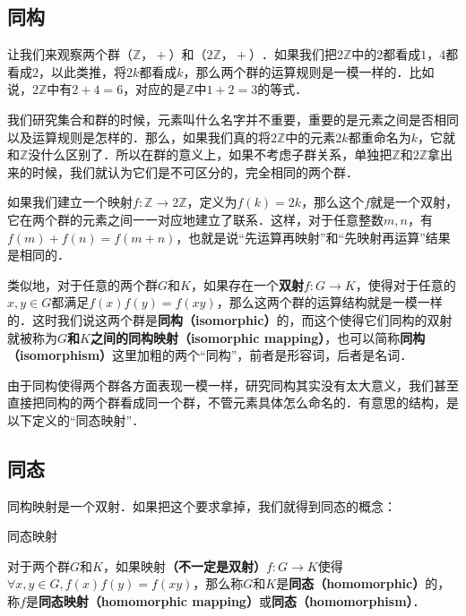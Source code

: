

\subsection{同构}

让我们来观察两个群$（\mathbb{Z}， +）$和$（2\mathbb{Z}，+）$．如果我们把$2\mathbb{Z}$中的$2$都看成$1$，$4$都看成$2$，以此类推，将$2k$都看成$k$，那么两个群的运算规则是一模一样的．比如说，$2\mathbb{Z}$中有$2+4=6$，对应的是$\mathbb{Z}$中$1+2=3$的等式．

我们研究集合和群的时候，元素叫什么名字并不重要，重要的是元素之间是否相同以及运算规则是怎样的．那么，如果我们真的将$2\mathbb{Z}$中的元素$2k$都重命名为$k$，它就和$\mathbb{Z}$没什么区别了．所以在群的意义上，如果不考虑子群关系，单独把$\mathbb{Z}$和$2\mathbb{Z}$拿出来的时候，我们就认为它们是不可区分的，完全相同的两个群．

如果我们建立一个映射$f:\mathbb{Z}\rightarrow2\mathbb{Z}$，定义为$f(k)=2k$，那么这个$f$就是一个双射，它在两个群的元素之间一一对应地建立了联系．这样，对于任意整数$m, n$，有$f(m)+f(n)=f(m+n)$，也就是说“先运算再映射”和“先映射再运算”结果是相同的．

类似地，对于任意的两个群$G$和$K$，如果存在一个\textbf{双射}$f:G\rightarrow K$，使得对于任意的$x, y\in G$都满足$f(x)f(y)=f(xy)$，那么这两个群的运算结构就是一模一样的．这时我们说这两个群是\textbf{同构（isomorphic）}的，而这个使得它们同构的双射就被称为\textbf{$G$和$K$之间的同构映射（isomorphic mapping）}，也可以简称\textbf{同构（isomorphism）}这里加粗的两个“同构”，前者是形容词，后者是名词．

由于同构使得两个群各方面表现一模一样，研究同构其实没有太大意义，我们甚至直接把同构的两个群看成同一个群，不管元素具体怎么命名的．有意思的结构，是以下定义的“同态映射”．

\subsection{同态}

同构映射是一个双射．如果把这个要求拿掉，我们就得到同态的概念：

\begin{definition}{同态映射}\label{Group2_def1}

对于两个群$G$和$K$，如果映射\textbf{（不一定是双射）}$f:G\rightarrow K$使得$\forall x, y\in G, f(x)f(y)=f(xy)$，那么称$G$和$K$是\textbf{同态（homomorphic）}的，称$f$是\textbf{同态映射（homomorphic mapping）}或\textbf{同态（homomorphism）}．

\end{definition}

